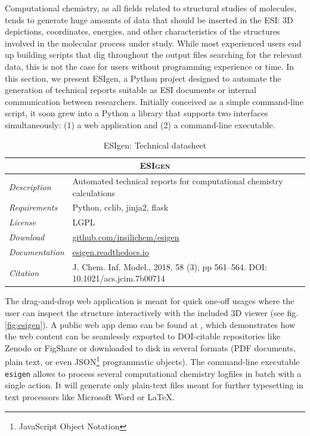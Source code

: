 Computational chemistry, as all fields related to structural studies of molecules, tends to generate huge amounts of data that should be inserted in the ESI: 3D depictions, coordinates, energies, and other characteristics of the structures involved in the molecular process under study. While most experienced users end up building scripts that dig throughout the output files searching for the relevant data, this is not the case for users without programming experience or time. In this section, we present ESIgen,\cite{esigen} a Python project designed to automate the generation of technical reports suitable as ESI documents or internal communication between researchers. Initially conceived as a simple command-line script, it soon grew into a Python a library that supports two interfaces simultaneously: (1) a web application and (2) a command-line executable.


\begin{table}[hbtp]
	\caption{ESIgen: Technical datasheet}
	\footnotesize
	\newcommand{\tableheading}[1]{\multicolumn{2}{c}{\textsc{#1}}}
	\begin{tabularx}{\textwidth}{RL}
		\toprule
		\tableheading{ESIgen}\\
		\toprule
		\textit{Description} & Automated technical reports for computational chemistry calculations \\
		\midrule
		\textit{Requirements} & Python, cclib, jinja2, flask \\
		\midrule
		\textit{License} & LGPL \\
		\midrule
		\textit{Download} & \href{https://github.com/insilichem/esigen}{github.com/insilichem/esigen} \\
		\midrule
		\textit{Documentation} & \href{http://esigen.readthedocs.io}{esigen.readthedocs.io} \\
		\midrule
		\textit{Citation} & J. Chem. Inf. Model., 2018, 58 (3), pp 561–564. DOI: 10.1021/acs.jcim.7b00714\cite{esigen} \\
		\bottomrule

	\end{tabularx}
\end{table}

The drag-and-drop web application is meant for quick one-off usages where the user can inspect the structure interactively with the included 3D viewer\cite{rose2018ngl} (see fig. \ref{fig:esigen}). A public web app demo can be found at \href{http://esi.insilichem.com}, which demonstrates how the web content can be seamlessly exported to DOI-citable repositories like Zenodo\cite{zenodo} or FigShare\cite{figshare} or downloaded to disk in several formats (PDF documents, plain text, or even JSON\footnote{JavaScript Object Notation} programmatic objects). The command-line executable \texttt{esigen} allows to process several computational chemistry logfiles in batch with a single action. It will generate only plain-text files meant for further typesetting in text processors like Microsoft Word or LaTeX.



